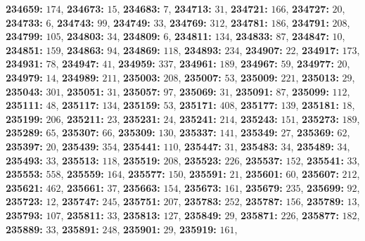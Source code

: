 \textsf{\bfseries 234659:} $174$, \textsf{\bfseries 234673:} $15$, \textsf{\bfseries 234683:} $7$, \textsf{\bfseries 234713:} $31$, \textsf{\bfseries 234721:} $166$, \textsf{\bfseries 234727:} $20$, \textsf{\bfseries 234733:} $6$, \textsf{\bfseries 234743:} $99$, \textsf{\bfseries 234749:} $33$, \textsf{\bfseries 234769:} $312$, \textsf{\bfseries 234781:} $186$, \textsf{\bfseries 234791:} $208$, \textsf{\bfseries 234799:} $105$, \textsf{\bfseries 234803:} $34$, \textsf{\bfseries 234809:} $6$, \textsf{\bfseries 234811:} $134$, \textsf{\bfseries 234833:} $87$, \textsf{\bfseries 234847:} $10$, \textsf{\bfseries 234851:} $159$, \textsf{\bfseries 234863:} $94$, \textsf{\bfseries 234869:} $118$, \textsf{\bfseries 234893:} $234$, \textsf{\bfseries 234907:} $22$, \textsf{\bfseries 234917:} $173$, \textsf{\bfseries 234931:} $78$, \textsf{\bfseries 234947:} $41$, \textsf{\bfseries 234959:} $337$, \textsf{\bfseries 234961:} $189$, \textsf{\bfseries 234967:} $59$, \textsf{\bfseries 234977:} $20$, \textsf{\bfseries 234979:} $14$, \textsf{\bfseries 234989:} $211$, \textsf{\bfseries 235003:} $208$, \textsf{\bfseries 235007:} $53$, \textsf{\bfseries 235009:} $221$, \textsf{\bfseries 235013:} $29$, \textsf{\bfseries 235043:} $301$, \textsf{\bfseries 235051:} $31$, \textsf{\bfseries 235057:} $97$, \textsf{\bfseries 235069:} $31$, \textsf{\bfseries 235091:} $87$, \textsf{\bfseries 235099:} $112$, \textsf{\bfseries 235111:} $48$, \textsf{\bfseries 235117:} $134$, \textsf{\bfseries 235159:} $53$, \textsf{\bfseries 235171:} $408$, \textsf{\bfseries 235177:} $139$, \textsf{\bfseries 235181:} $18$, \textsf{\bfseries 235199:} $206$, \textsf{\bfseries 235211:} $23$, \textsf{\bfseries 235231:} $24$, \textsf{\bfseries 235241:} $214$, \textsf{\bfseries 235243:} $151$, \textsf{\bfseries 235273:} $189$, \textsf{\bfseries 235289:} $65$, \textsf{\bfseries 235307:} $66$, \textsf{\bfseries 235309:} $130$, \textsf{\bfseries 235337:} $141$, \textsf{\bfseries 235349:} $27$, \textsf{\bfseries 235369:} $62$, \textsf{\bfseries 235397:} $20$, \textsf{\bfseries 235439:} $354$, \textsf{\bfseries 235441:} $110$, \textsf{\bfseries 235447:} $31$, \textsf{\bfseries 235483:} $34$, \textsf{\bfseries 235489:} $34$, \textsf{\bfseries 235493:} $33$, \textsf{\bfseries 235513:} $118$, \textsf{\bfseries 235519:} $208$, \textsf{\bfseries 235523:} $226$, \textsf{\bfseries 235537:} $152$, \textsf{\bfseries 235541:} $33$, \textsf{\bfseries 235553:} $558$, \textsf{\bfseries 235559:} $164$, \textsf{\bfseries 235577:} $150$, \textsf{\bfseries 235591:} $21$, \textsf{\bfseries 235601:} $60$, \textsf{\bfseries 235607:} $212$, \textsf{\bfseries 235621:} $462$, \textsf{\bfseries 235661:} $37$, \textsf{\bfseries 235663:} $154$, \textsf{\bfseries 235673:} $161$, \textsf{\bfseries 235679:} $235$, \textsf{\bfseries 235699:} $92$, \textsf{\bfseries 235723:} $12$, \textsf{\bfseries 235747:} $245$, \textsf{\bfseries 235751:} $207$, \textsf{\bfseries 235783:} $252$, \textsf{\bfseries 235787:} $156$, \textsf{\bfseries 235789:} $13$, \textsf{\bfseries 235793:} $107$, \textsf{\bfseries 235811:} $33$, \textsf{\bfseries 235813:} $127$, \textsf{\bfseries 235849:} $29$, \textsf{\bfseries 235871:} $226$, \textsf{\bfseries 235877:} $182$, \textsf{\bfseries 235889:} $33$, \textsf{\bfseries 235891:} $248$, \textsf{\bfseries 235901:} $29$, \textsf{\bfseries 235919:} $161$, 

